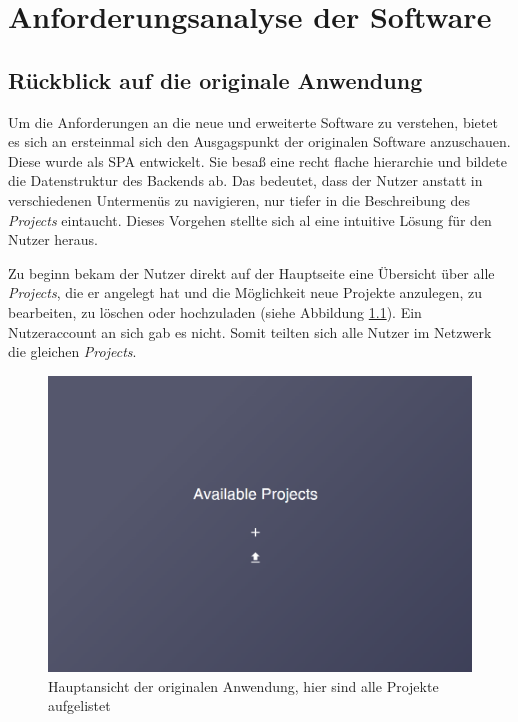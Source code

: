 
\chapter{Anforderungsanalyse der Software}

\section{Rückblick auf die originale Anwendung}
Um die Anforderungen an die neue und erweiterte Software zu verstehen, bietet es sich an ersteinmal sich den Ausgagspunkt der originalen Software anzuschauen.
Diese wurde als \acf{SPA} entwickelt. Sie besaß eine recht flache hierarchie und bildete die Datenstruktur des Backends ab. Das bedeutet, dass der Nutzer anstatt in verschiedenen Untermenüs zu navigieren, nur tiefer in die Beschreibung des \textit{Projects} eintaucht.
Dieses Vorgehen stellte sich al eine intuitive Lösung für den Nutzer heraus.


Zu beginn bekam der Nutzer direkt auf der Hauptseite eine Übersicht über alle \textit{Projects}, die er angelegt hat und die Möglichkeit neue Projekte anzulegen, zu bearbeiten, zu löschen oder hochzuladen (siehe Abbildung \ref{fig:old_mainpage_start}).
Ein Nutzeraccount an sich gab es nicht. Somit teilten sich alle Nutzer im Netzwerk die gleichen \textit{Projects}.

\begin{figure}[htbp]
    \centering
    \includegraphics[width=0.9\linewidth]{includes/figures/old_version/ui_old_mainpage.png}
    \caption{Hauptansicht der originalen Anwendung, hier sind alle Projekte aufgelistet}
    \label{fig:old_mainpage_start}
\end{figure}

